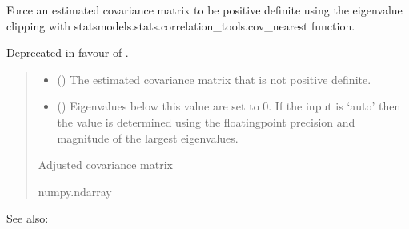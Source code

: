 \documentclass[letterpaper,10pt,english]{sphinxmanual}
\begin{document}
\begin{fulllineitems}
\label{\detokenize{misc:glomar_gridding.covariance_tools.perturb_cov_to_positive_definite}}
\pysigstartsignatures
\pysiglinewithargsret
{}
{\sphinxparamcomma {}}
{}
\pysigstopsignatures
\sphinxAtStartPar
Force an estimated covariance matrix to be positive definite using the
eigenvalue clipping with statsmodels.stats.correlation\_tools.cov\_nearest
function.

\sphinxAtStartPar
Deprecated in favour of
{\hyperref[\detokenize{misc:glomar_gridding.covariance_tools.simple_clipping}]{}}.
\begin{quote}\begin{description}
\begin{itemize}
\item {}
\sphinxAtStartPar
{} () \textendash{} The estimated covariance matrix that is not positive definite.

\item {}
\sphinxAtStartPar
{} (\sphinxstyleliteralemphasis{\sphinxupquote{ | }}) \textendash{} Eigenvalues below this value are set to 0. If the input is ‘auto’ then
the value is determined using the floating\sphinxhyphen{}point precision and magnitude
of the largest eigenvalues.

\end{itemize}

\sphinxAtStartPar
{} \textendash{} Adjusted covariance matrix

\sphinxAtStartPar
numpy.ndarray

\end{description}\end{quote}


\begin{sphinxseealso}{See also:}


\end{sphinxseealso}
\end{fulllineitems}
\end{document}
